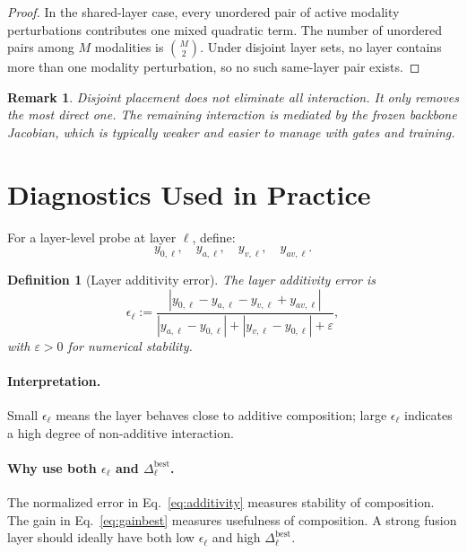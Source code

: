 \documentclass[11pt]{article}
\newtheorem{definition}{Definition}
\newtheorem{remark}{Remark}
\begin{document}
\begin{proof}
In the shared-layer case, every unordered pair of active modality
perturbations contributes one mixed quadratic term. The number of unordered
pairs among $M$ modalities is $\binom{M}{2}$. Under disjoint layer sets, no
layer contains more than one modality perturbation, so no such same-layer pair
exists.
\end{proof}

\begin{remark}
Disjoint placement does \emph{not} eliminate all interaction. It only removes
the most direct one. The remaining interaction is mediated by the frozen
backbone Jacobian, which is typically weaker and easier to manage with gates
and training.
\end{remark}

\section{Diagnostics Used in Practice}

For a layer-level probe at layer $\ell$, define:
\[
y_{0,\ell}, \quad y_{a,\ell}, \quad y_{v,\ell}, \quad y_{av,\ell}.
\]

\begin{definition}[Layer additivity error]
The layer additivity error is
\begin{equation}
\epsilon_\ell
:=
\frac{\left|y_{0,\ell} - y_{a,\ell} - y_{v,\ell} + y_{av,\ell}\right|}
{\left|y_{a,\ell}-y_{0,\ell}\right| + \left|y_{v,\ell}-y_{0,\ell}\right| + \varepsilon},
\label{eq:additivity}
\end{equation}
with $\varepsilon > 0$ for numerical stability.
\end{definition}

\paragraph{Interpretation.}
Small $\epsilon_\ell$ means the layer behaves close to additive composition;
large $\epsilon_\ell$ indicates a high degree of non-additive interaction.

\paragraph{Why use both $\epsilon_\ell$ and $\Delta^{\mathrm{best}}_\ell$.}
The normalized error in Eq.~\eqref{eq:additivity} measures stability of
composition. The gain in Eq.~\eqref{eq:gainbest} measures usefulness of
composition. A strong fusion layer should ideally have both low
$\epsilon_\ell$ and high $\Delta^{\mathrm{best}}_\ell$.
\end{document}
